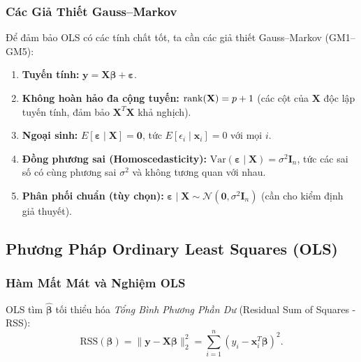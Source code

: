 \subsubsection{Các Giả Thiết Gauss–Markov}

Để đảm bảo OLS có các tính chất tốt, ta cần các giả thiết Gauss–Markov
(GM1–GM5):

\begin{enumerate}[label=\textbf{GM\arabic*.}]
    \item \textbf{Tuyến tính:} $\mathbf{y} = \mathbf{X}\boldsymbol{\beta} +
          \boldsymbol{\varepsilon}$.
    \item \textbf{Không hoàn hảo đa cộng tuyến:} $\operatorname{rank}(\mathbf{X}) = p+1$
          (các cột của $\mathbf{X}$ độc lập tuyến tính, đảm bảo
          $\mathbf{X}^T\mathbf{X}$ khả nghịch).
    \item \textbf{Ngoại sinh:} $E[\boldsymbol{\varepsilon} \mid \mathbf{X}] =
          \mathbf{0}$, tức $E[\epsilon_i \mid \mathbf{x}_i] = 0$ với mọi $i$.
    \item \textbf{Đồng phương sai (Homoscedasticity):}
          $\mathrm{Var}(\boldsymbol{\varepsilon} \mid \mathbf{X}) =
          \sigma^2 \mathbf{I}_n$, tức các sai số có cùng phương sai $\sigma^2$
          và không tương quan với nhau.
    \item \textbf{Phân phối chuẩn (tùy chọn):}
          $\boldsymbol{\varepsilon} \mid \mathbf{X} \sim
          \mathcal{N}(\mathbf{0}, \sigma^2 \mathbf{I}_n)$
          (cần cho kiểm định giả thuyết).
\end{enumerate}

\subsection{Phương Pháp Ordinary Least Squares (OLS)}

\subsubsection{Hàm Mất Mát và Nghiệm OLS}

OLS tìm $\hat{\boldsymbol{\beta}}$ tối thiểu hóa \emph{Tổng Bình Phương Phần
Dư} (Residual Sum of Squares - RSS):
\begin{equation}
    \mathrm{RSS}(\boldsymbol{\beta})
    = \|\mathbf{y} - \mathbf{X}\boldsymbol{\beta}\|_2^2
    = \sum_{i=1}^n (y_i - \mathbf{x}_i^T\boldsymbol{\beta})^2.
    \label{eq:rss}
\end{equation}

